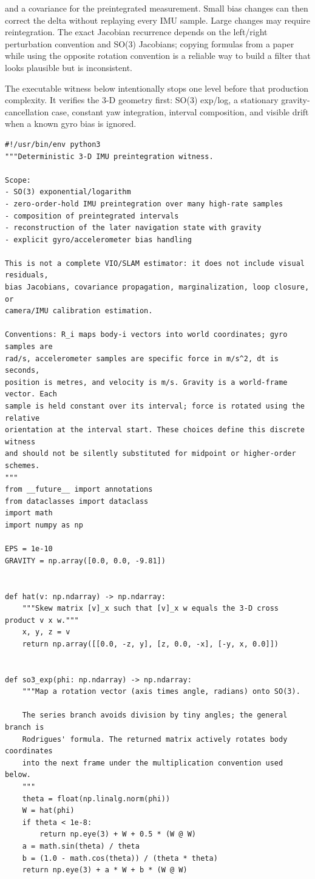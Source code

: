 and a covariance for the preintegrated measurement. Small bias changes can then correct the delta without replaying every IMU sample. Large changes may require reintegration. The exact Jacobian recurrence depends on the left/right perturbation convention and SO(3) Jacobians; copying formulas from a paper while using the opposite rotation convention is a reliable way to build a filter that looks plausible but is inconsistent.

The executable witness below intentionally stops one level before that production complexity. It verifies the 3-D geometry first: SO(3) exp/log, a stationary gravity-cancellation case, constant yaw integration, interval composition, and visible drift when a known gyro bias is ignored.

\begin{verbatim}
#!/usr/bin/env python3
"""Deterministic 3-D IMU preintegration witness.

Scope:
- SO(3) exponential/logarithm
- zero-order-hold IMU preintegration over many high-rate samples
- composition of preintegrated intervals
- reconstruction of the later navigation state with gravity
- explicit gyro/accelerometer bias handling

This is not a complete VIO/SLAM estimator: it does not include visual residuals,
bias Jacobians, covariance propagation, marginalization, loop closure, or
camera/IMU calibration estimation.

Conventions: R_i maps body-i vectors into world coordinates; gyro samples are
rad/s, accelerometer samples are specific force in m/s^2, dt is seconds,
position is metres, and velocity is m/s. Gravity is a world-frame vector. Each
sample is held constant over its interval; force is rotated using the relative
orientation at the interval start. These choices define this discrete witness
and should not be silently substituted for midpoint or higher-order schemes.
"""
from __future__ import annotations
from dataclasses import dataclass
import math
import numpy as np

EPS = 1e-10
GRAVITY = np.array([0.0, 0.0, -9.81])


def hat(v: np.ndarray) -> np.ndarray:
    """Skew matrix [v]_x such that [v]_x w equals the 3-D cross product v x w."""
    x, y, z = v
    return np.array([[0.0, -z, y], [z, 0.0, -x], [-y, x, 0.0]])


def so3_exp(phi: np.ndarray) -> np.ndarray:
    """Map a rotation vector (axis times angle, radians) onto SO(3).

    The series branch avoids division by tiny angles; the general branch is
    Rodrigues' formula. The returned matrix actively rotates body coordinates
    into the next frame under the multiplication convention used below.
    """
    theta = float(np.linalg.norm(phi))
    W = hat(phi)
    if theta < 1e-8:
        return np.eye(3) + W + 0.5 * (W @ W)
    a = math.sin(theta) / theta
    b = (1.0 - math.cos(theta)) / (theta * theta)
    return np.eye(3) + a * W + b * (W @ W)



\end{verbatim}
